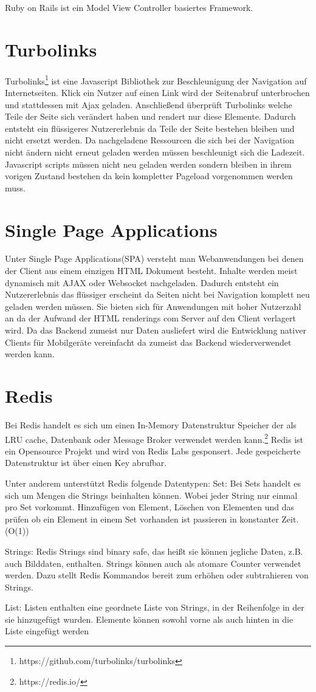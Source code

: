 Ruby on Rails ist ein Model View Controller basiertes Framework.

\section{Turbolinks}
Turbolinks\footnote{https://github.com/turbolinks/turbolinks} ist eine Javascript Bibliothek zur Beschleunigung der Navigation auf Internetseiten. Klick ein Nutzer auf einen Link wird der Seitenabruf unterbrochen und stattdessen mit Ajax geladen. Anschließend überprüft Turbolinks welche Teile der Seite sich verändert haben und rendert nur diese Elemente. Dadurch entsteht ein flüssigeres Nutzererlebnis da Teile der Seite bestehen bleiben und nicht ersetzt werden. Da nachgeladene Ressourcen die sich bei der Navigation nicht ändern nicht erneut geladen werden müssen beschleunigt sich die Ladezeit. Javascript scripts müssen nicht neu geladen werden sondern bleiben in ihrem vorigen Zustand bestehen da kein kompletter Pageload vorgenommen werden muss.

\section{Single Page Applications}

Unter Single Page Applications(SPA) versteht man Webanwendungen bei denen der Client aus einem einzigen HTML Dokument besteht.\cite{spa-def} Inhalte werden meist dynamisch mit AJAX oder Websocket nachgeladen. Dadurch entsteht ein Nutzererlebnis das flüssiger erscheint da Seiten nicht bei Navigation komplett neu geladen werden müssen. Sie bieten sich für Anwendungen mit hoher Nutzerzahl an da der Aufwand der HTML renderings com Server auf den Client verlagert wird. Da das Backend zumeist nur Daten ausliefert wird die Entwicklung nativer Clients für Mobilgeräte vereinfacht da zumeist das Backend wiederverwendet werden kann.

\section{Redis}
Bei Redis handelt es sich um einen In-Memory Datenstruktur Speicher der als LRU cache, Datenbank oder Message Broker verwendet werden kann.\footnote{https://redis.io/} Redis ist ein Opensource Projekt und  wird von Redis Labs gesponsert. Jede gespeicherte Datenstruktur ist über einen Key abrufbar.

Unter anderem unterstützt Redis folgende Datentypen:
Set:
Bei Sets handelt es sich um Mengen die Strings beinhalten können. Wobei jeder String nur einmal pro Set vorkommt. Hinzufügen von Element, Löschen von Elementen und das prüfen ob ein Element in einem Set vorhanden ist passieren in konstanter Zeit. (O(1))

Strings:
Redis Strings sind binary safe, das heißt sie können jegliche Daten, z.B. auch Bilddaten, enthalten. Strings können auch als atomare Counter verwendet werden. Dazu stellt Redis Kommandos bereit zum erhöhen oder subtrahieren von Strings.

List:
Listen enthalten eine geordnete Liste von Strings, in der Reihenfolge in der sie hinzugefügt wurden. Elemente können sowohl vorne als auch hinten in die Liste eingefügt werden
